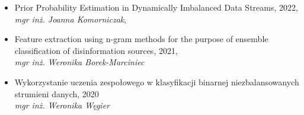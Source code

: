 \begin{itemize}
	\item Prior Probability Estimation in Dynamically Imbalanced Data Streams, 2022,\\\emph{mgr inż. Joanna Komorniczak},
	\item Feature extraction using n-gram methods for the purpose of ensemble classification of disinformation sources, 2021,\\\emph{mgr inż. Weronika Borek-Marciniec}
	\item Wykorzystanie uczenia zespołowego w klasyfikacji binarnej niezbalansowanych strumieni danych, 2020\\\emph{mgr inż. Weronika Węgier}

\end{itemize}
